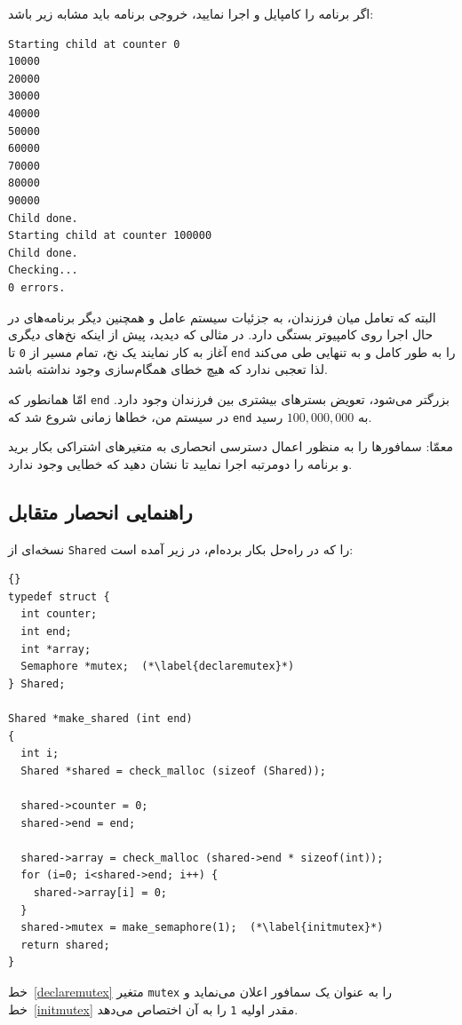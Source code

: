 \documentclass{book}
\newcommand{\clearemptydoublepage}{}%
\begin{document}
    اگر برنامه را کامپایل و اجرا نمایید، خروجی برنامه باید مشابه زیر باشد: 

\begingroup
\setLTR
\begin{verbatim}
Starting child at counter 0
10000
20000
30000
40000
50000
60000
70000
80000
90000
Child done.
Starting child at counter 100000
Child done.
Checking...
0 errors.
\end{verbatim}
\endgroup

    البته که تعامل میان فرزندان، به جزئیات سیستم عامل و همچنین دیگر برنامه‌های در حال اجرا روی کامپیوتر بستگی دارد. 
    در مثالی که دیدید، پیش از اینکه نخ‌های دیگری آغاز به کار نمایند یک نخ، تمام مسیر از {\tt 0} تا  {\tt end} را به طور کامل و به تنهایی طی می‌کند
    لذا تعجبی ندارد که هیچ خطای همگام‌سازی وجود نداشته باشد. 

    امّا همانطور که {\tt end}  بزرگتر می‌شود، تعویض بسترهای بیشتری بین فرزندان وجود دارد. 
    در سیستم من، خطاها زمانی شروع شد که {\tt end} به  $100,000,000$ رسید. 

    معمّا:‌ سمافورها را به منظور اعمال دسترسی انحصاری به متغیرهای اشتراکی بکار برید و برنامه را دومرتبه اجرا نمایید تا نشان دهید که خطایی وجود ندارد. 
    
\clearemptydoublepage
\subsection{راهنمایی انحصار متقابل}

    نسخه‌ای از {\tt Shared} را که در راه‌حل بکار برده‌ام، در زیر آمده است:

\begin{latin}
\begin{lstlisting}[title={}]{}
typedef struct {
  int counter;
  int end;
  int *array;
  Semaphore *mutex;  (*\label{declaremutex}*)
} Shared;

Shared *make_shared (int end)
{
  int i;
  Shared *shared = check_malloc (sizeof (Shared));

  shared->counter = 0;
  shared->end = end;

  shared->array = check_malloc (shared->end * sizeof(int));
  for (i=0; i<shared->end; i++) {
    shared->array[i] = 0;
  }
  shared->mutex = make_semaphore(1);  (*\label{initmutex}*)
  return shared;
}
\end{lstlisting}
\end{latin}

    خط~\ref{declaremutex} متغیر  {\tt mutex} را به عنوان یک سمافور اعلان می‌نماید و 
    خط~\ref{initmutex} مقدر اولیه  {\tt 1} را به آن اختصاص می‌دهد. 
\end{document}
